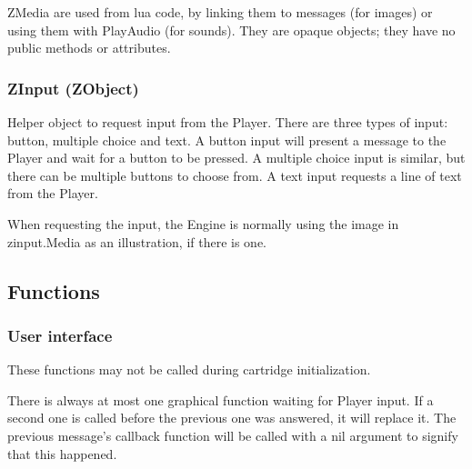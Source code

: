 \documentclass{article}
\begin{document}
ZMedia are used from lua code, by linking them to messages (for images) or
using them with PlayAudio (for sounds). They are opaque objects; they have no
public methods or attributes.

\subsubsection{ZInput (ZObject)}
Helper object to request input from the Player. There are three types of input:
button, multiple choice and text. A button input will present a message to the
Player and wait for a button to be pressed. A multiple choice input is similar,
but there can be multiple buttons to choose from. A text input requests a line
of text from the Player.

When requesting the input, the Engine is normally using the image in
zinput.Media as an illustration, if there is one.

\subsection{Functions}
\subsubsection{User interface}
These functions may not be called during cartridge initialization.

There is always at most one graphical function waiting for Player input. If a
second one is called before the previous one was answered, it will replace it.
The previous message's callback function will be called with a nil argument to
signify that this happened.
\end{document}
